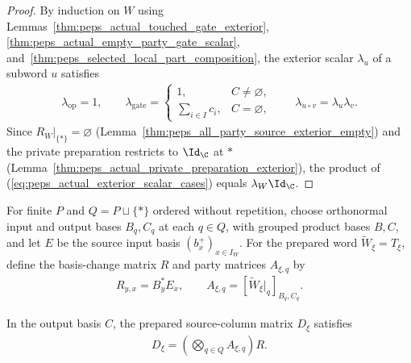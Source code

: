 \begin{proof}
    \leanok
    By induction on $W$ using Lemmas~\ref{thm:peps_actual_touched_gate_exterior},
    \ref{thm:peps_actual_empty_party_gate_scalar},
    and~\ref{thm:peps_selected_local_part_composition}, the exterior scalar
    $\lambda_u$ of a subword $u$ satisfies
    \begin{align}
        \lambda_{\mathrm{op}}=1,\qquad
        \lambda_{\mathrm{gate}}=
        \begin{cases}
            1,                & C\neq\varnothing, \\
            \sum_{i\in I}c_i, & C=\varnothing,
        \end{cases}
        \qquad
        \lambda_{u\circ v}=\lambda_u\lambda_v.
        \label{eq:peps_actual_exterior_scalar_cases}
    \end{align}
    Since $R_W|_{\{*\}}=\varnothing$ (Lemma~\ref{thm:peps_all_party_source_exterior_empty})
    and the private preparation restricts to $\Id_{\C}$ at $*$
    (Lemma~\ref{thm:peps_actual_private_preparation_exterior}), the product of
    (\ref{eq:peps_actual_exterior_scalar_cases}) equals $\lambda_W\Id_{\C}$.
\end{proof}

\begin{definition}
    \label{def:peps_actual_party_source_matrices}
    \leanok
    For finite $P$ and $Q=P\sqcup\{*\}$ ordered without repetition, choose
    orthonormal input and output bases $B_q,C_q$ at each $q\in Q$, with grouped
    product bases $B,C$, and let $E$ be
    the source input basis $(b_x^+)_{x\in I_W}$. For the prepared word
    $\widetilde W_\xi=T_\xi$, define the basis-change matrix $R$ and party
    matrices $A_{\xi,q}$ by
    \begin{align}
        R_{y,x}=B^*_{y}E_x,\qquad
        A_{\xi,q}=[\widetilde W_\xi|_q]_{B_q,C_q}.
        \label{eq:peps_actual_party_source_matrices}
    \end{align}
\end{definition}

\begin{lemma}
    \label{thm:peps_actual_party_source_columns}
    \leanok
    In the output basis $C$, the prepared source-column matrix $D_\xi$ satisfies
    \begin{align}
        D_\xi=\left(\bigotimes_{q\in Q} A_{\xi,q}\right)R.
        \label{eq:peps_actual_party_source_columns}
    \end{align}
\end{lemma}

